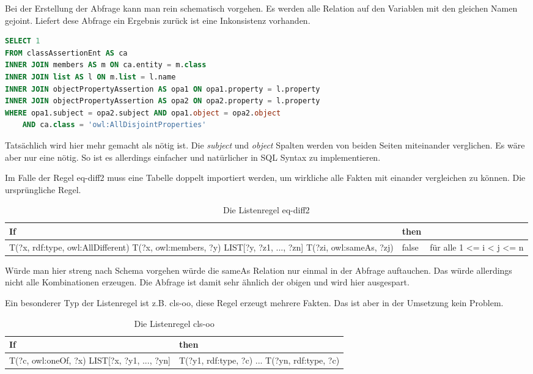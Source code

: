 Bei der Erstellung der Abfrage kann man rein schematisch vorgehen. Es werden alle Relation auf den Variablen mit den gleichen Namen gejoint. Liefert dese Abfrage ein Ergebnis zurück ist eine Inkonsistenz vorhanden.

\begin{lstlisting}[language=SQL]
SELECT 1
FROM classAssertionEnt AS ca
INNER JOIN members AS m ON ca.entity = m.class
INNER JOIN list AS l ON m.list = l.name
INNER JOIN objectPropertyAssertion AS opa1 ON opa1.property = l.property
INNER JOIN objectPropertyAssertion AS opa2 ON opa2.property = l.property
WHERE opa1.subject = opa2.subject AND opa1.object = opa2.object
	AND ca.class = 'owl:AllDisjointProperties'
\end{lstlisting}

Tatsächlich wird hier mehr gemacht als nötig ist. Die \emph{subject} und \emph{object} Spalten werden von beiden Seiten miteinander verglichen. Es wäre aber nur eine nötig. So ist es allerdings einfacher und natürlicher in SQL Syntax zu implementieren.

Im Falle der Regel eq-diff2 muss eine Tabelle doppelt importiert werden, um wirkliche alle Fakten mit einander vergleichen zu können. Die ursprüngliche Regel.
\begin{table}
\begin{tabular}{l|l|l}
If & then & \\ \hline
T(?x, rdf:type, owl:AllDifferent)
T(?x, owl:members, ?y)
LIST[?y, ?z1, ..., ?zn]
T(?zi, owl:sameAs, ?zj) & false & für alle 1 <= i < j <= n
\end{tabular}
\caption{Die Listenregel eq-diff2}
\label{rule-eq-diff2}
\end{table}


Würde man hier streng nach Schema vorgehen würde die sameAs Relation nur einmal in der Abfrage auftauchen. Das würde allerdings nicht alle Kombinationen erzeugen. Die Abfrage ist damit sehr ähnlich der obigen und wird hier ausgespart.

Ein besonderer Typ der Listenregel ist z.B. cls-oo, diese Regel erzeugt mehrere Fakten. Das ist aber in der Umsetzung kein Problem.
\begin{table}
\begin{tabular}{l|l}
If & then \\ \hline
T(?c, owl:oneOf, ?x)
LIST[?x, ?y1, ..., ?yn] & T(?y1, rdf:type, ?c)
								...
								T(?yn, rdf:type, ?c) 
\end{tabular}
\caption{Die Listenregel cls-oo}
\label{rule-cls-oo}
\end{table}


